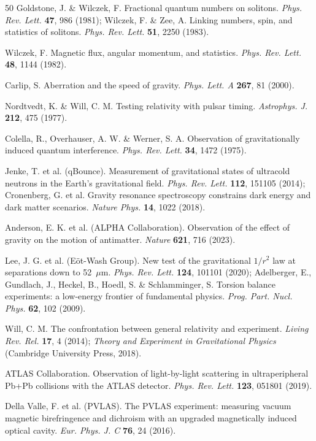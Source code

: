 \documentclass[UTF8,fontset=none,11pt,a4paper]{ctexart}
\begin{document}
\begin{thebibliography}{50}
 Goldstone, J. \& Wilczek, F. Fractional quantum numbers on solitons.
\emph{Phys. Rev. Lett.} \textbf{47}, 986 (1981); Wilczek, F. \& Zee, A. Linking numbers, spin,
and statistics of solitons. \emph{Phys. Rev. Lett.} \textbf{51}, 2250 (1983).

 Wilczek, F. Magnetic flux, angular momentum, and statistics.
\emph{Phys. Rev. Lett.} \textbf{48}, 1144 (1982).

 Carlip, S. Aberration and the speed of gravity. \emph{Phys. Lett. A}
\textbf{267}, 81 (2000).

 Nordtvedt, K. \& Will, C. M. Testing relativity with pulsar timing.
\emph{Astrophys. J.} \textbf{212}, 475 (1977).

 Colella, R., Overhauser, A. W. \& Werner, S. A. Observation of
gravitationally induced quantum interference. \emph{Phys. Rev. Lett.} \textbf{34}, 1472 (1975).

 Jenke, T. et al. (qBounce). Measurement of gravitational states of ultracold
neutrons in the Earth's gravitational field. \emph{Phys. Rev. Lett.} \textbf{112}, 151105 (2014);
Cronenberg, G. et al. Gravity resonance spectroscopy constrains dark energy and dark matter
scenarios. \emph{Nature Phys.} \textbf{14}, 1022 (2018).

 Anderson, E. K. et al. (ALPHA Collaboration). Observation of the effect of
gravity on the motion of antimatter. \emph{Nature} \textbf{621}, 716 (2023).

 Lee, J. G. et al. (E\"ot-Wash Group). New test of the gravitational $1/r^2$ law
at separations down to 52~$\mu$m. \emph{Phys. Rev. Lett.} \textbf{124}, 101101 (2020);
Adelberger, E., Gundlach, J., Heckel, B., Hoedl, S. \& Schlamminger, S. Torsion balance
experiments: a low-energy frontier of fundamental physics. \emph{Prog. Part. Nucl. Phys.}
\textbf{62}, 102 (2009).

 Will, C. M. The confrontation between general relativity and experiment.
\emph{Living Rev. Rel.} \textbf{17}, 4 (2014); \emph{Theory and Experiment in Gravitational
Physics} (Cambridge University Press, 2018).

 ATLAS Collaboration. Observation of light-by-light scattering in
ultraperipheral Pb+Pb collisions with the ATLAS detector. \emph{Phys. Rev. Lett.} \textbf{123},
051801 (2019).

 Della Valle, F. et al. (PVLAS). The PVLAS experiment: measuring vacuum
magnetic birefringence and dichroism with an upgraded magnetically induced optical cavity.
\emph{Eur. Phys. J. C} \textbf{76}, 24 (2016).


\end{thebibliography}
\end{document}
